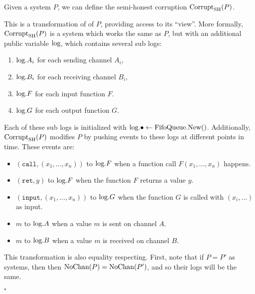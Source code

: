 \begin{definition}
Given a system $P$, we can define
the semi-honest corruption $\text{Corrupt}_{\text{SH}}(P)$.

This is a transformation of
of $P$, providing access to its ``view''.
More formally, $\text{Corrupt}_{\text{SH}}(P)$ is a system which works the same
as $P$, but with an additional public variable $\text{log}$,
which contains several sub logs:
\begin{enumerate}
  \item $\text{log}.{A_i}$ for each sending channel $A_i$,
  \item $\text{log}.{B_i}$ for each receiving channel $B_i$,
  \item $\text{log}.F$ for each input function $F$.
  \item $\text{log}.G$ for each output function $G$.
\end{enumerate}
Each of these sub logs is initialized with ${\text{log}.\bullet \gets \text{FifoQueue.New()}}$.
Additionally, $\text{Corrupt}_{\text{SH}}(P)$ modifies $P$ by pushing events to these
logs at different points in time.
These events are:
\begin{itemize}
\item $(\texttt{call}, (x_1, \ldots, x_n))$ to $\text{log}.F$ when a function call $F(x_1, \ldots, x_n)$ happens.
\item $(\texttt{ret}, y)$ to $\text{log}.F$ when the function $F$ returns a value $y$.
\item $(\texttt{input}, (x_1, \ldots, x_n))$ to $\text{log}.G$ when the function $G$ is called with $(x_i, \ldots)$ as input.
\item $m$ to $\text{log}.A$ when a value $m$ is sent on channel $A$.
\item $m$ to $\text{log}.B$ when a value $m$ is received on channel $B$.
\end{itemize}

This transformation is also equality respecting.
First, note that if $P = P'$ as systems, then
then $\text{NoChan}(P) = \text{NoChan}(P')$, and so their logs will be the same.

$\square$
\end{definition}

